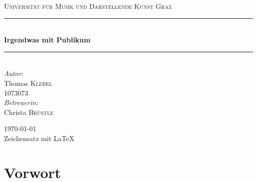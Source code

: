 \documentclass[a4paper, german, oneside]{scrbook}
\date{\displaydate{date}}
\begin{document}
	\begin{titlepage}
	
		\begin{center}



		\textsc{\LARGE Universität für Musik und Darstellende Kunst Graz}\\[1.5cm]



		\newcommand{\HRule}{\rule{\linewidth}{0.5mm}}
		\HRule \\[0.4cm]
		{ \huge \bfseries Irgendwas mit Publikum}\\[0.4cm]

		\HRule \\[2.5cm] %



		\Large \emph{Autor}:\\
		Thomas \textsc{Klebel}\\[0.1cm]
		\large 1073073\\[1cm]

		\Large \emph{Betreuerin:}\\
		Christa \textsc{Brüstle}\\[1cm]



		\vfill

		\Large{\today}\\[1cm]
		\normalsize{Zeichensatz mit \LaTeX}
		

		\end{center}

	\end{titlepage}

	
\clearpage
\setcounter{page}{1}

\tableofcontents

\chapter*{Vorwort}
\end{document}
